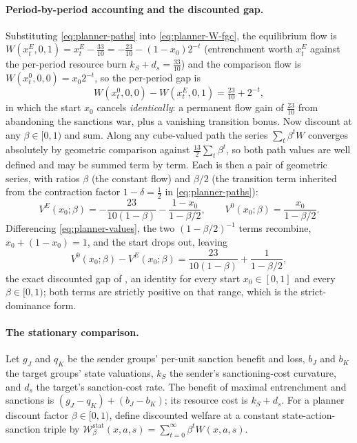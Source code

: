 \paragraph{Period-by-period accounting and the discounted gap.}
Substituting \eqref{eq:planner-paths} into \eqref{eq:planner-W-fgc}, the
equilibrium flow is
$W(x^E_t,0,1)=x^E_t-\tfrac{33}{10}=-\tfrac{23}{10}-(1-x_0)2^{-t}$
(entrenchment worth $x^E_t$ against the per-period resource burn
$k_S+d_s=\tfrac{33}{10}$) and the comparison flow is
$W(x^0_t,0,0)=x_0 2^{-t}$, so the per-period gap is
\begin{equation}
W(x^0_t,0,0)-W(x^E_t,0,1)=\tfrac{23}{10}+2^{-t},
\label{eq:planner-gap}
\end{equation}
in which the start $x_0$ cancels \emph{identically}: a permanent flow gain
of $\tfrac{23}{10}$ from abandoning the sanctions war, plus a vanishing
transition bonus. Now discount at any $\beta\in[0,1)$ and sum. Along any
cube-valued path the series $\sum_t\beta^t W$ converges absolutely by
geometric comparison against $\tfrac{13}{2}\sum_t\beta^t$, so both path
values are well defined and may be summed term by term. Each is then a
pair of geometric series, with ratios $\beta$ (the constant flow) and
$\beta/2$ (the transition term inherited from the contraction factor
$1-\delta=\tfrac12$ in \eqref{eq:planner-paths}):
\begin{equation}
V^E(x_0;\beta)=-\frac{23}{10(1-\beta)}-\frac{1-x_0}{1-\beta/2},
\qquad
V^0(x_0;\beta)=\frac{x_0}{1-\beta/2}.
\label{eq:planner-values}
\end{equation}
Differencing \eqref{eq:planner-values}, the two $(1-\beta/2)^{-1}$ terms
recombine, $x_0+(1-x_0)=1$, and the start drops out, leaving
\[
V^0(x_0;\beta)-V^E(x_0;\beta)
=\frac{23}{10(1-\beta)}+\frac{1}{1-\beta/2},
\]
the exact discounted gap of , an identity for
every start $x_0\in[0,1]$ and every $\beta\in[0,1)$; both terms are
strictly positive on that range, which is the strict-dominance form.

\paragraph{The stationary comparison.}
Let $g_J$ and $q_K$ be the sender groups' per-unit sanction benefit and
loss, $b_J$ and $b_K$ the target groups' state valuations, $k_S$ the
sender's sanctioning-cost curvature, and $d_s$ the target's sanction-cost
rate. The benefit of maximal entrenchment and sanctions is
$(g_J-q_K)+(b_J-b_K)$; its resource cost is $k_S+d_s$. For a planner discount
factor $\beta\in[0,1)$, define discounted welfare at a constant
state-action-sanction triple by
$\mathcal W_\beta^{\mathrm{stat}}(x,a,s)=\sum_{t=0}^{\infty}\beta^t W(x,a,s)$.

